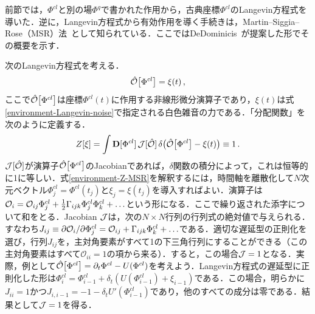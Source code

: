 \documentclass[a4paper,11pt]{ltjsarticle}
\def\D{\mathbf{D}}
\begin{document}
前節では，$\Phi^{cl}$と別の場$\Phi^q$で書かれた作用から，古典座標$\Phi^{cl}$のLangevin方程式を導いた．逆に，Langevin方程式から有効作用を導く手続きは，Martin--Siggia--Rose（MSR）法~\cite{Martin:1973zz}として知られている．ここではDeDominicis~\cite{DeDominicis}が提案した形でその概要を示す．


次のLangevin方程式を考える．
\begin{equation}
\hat {\cal O}\big[\Phi^{cl}\big] = \xi(t)\, ,
\end{equation}ここで$\hat {\cal O}\big[\Phi^{cl}\big]$は座標$\Phi^{cl}(t)$に作用する非線形微分演算子であり，$\xi(t)$は式\eqref{environment-Langevin-noise}で指定される白色雑音の力である．「分配関数」を次のように定義する．
\begin{equation}\label{environment-Z-MSR}
Z[\xi]=\int\D[\Phi^{cl}]\, {\cal J}[\hat {\cal O }
]\,\delta\big(\hat {\cal O}\big[\Phi^{cl}\big] - \xi(t)\big) \equiv
1\, .
\end{equation}${\cal J}[\hat {\cal O}]$が演算子$\hat {\cal O}\big[\Phi^{cl}\big]$のJacobianであれば，$\delta$関数の積分によって，これは恒等的に1に等しい．式\eqref{environment-Z-MSR}を解釈するには，時間軸を離散化して$N$次元ベクトル$\Phi^{cl}_j=\Phi^{cl}(t_j)$と$\xi_j=\xi(t_j)$を導入すればよい．演算子は${\cal O}_i=\mathcal{O}_{ij}\Phi^{cl}_j+{1\over
2}\Gamma_{ijk}\Phi^{cl}_j\Phi^{cl}_k +\ldots$という形になる．ここで繰り返された添字について和をとる．Jacobian ${\cal J}$は，次の$N\times N$行列の行列式の絶対値で与えられる．すなわち$J_{ij}\equiv
\partial {\cal O}_i/ \partial\Phi^{cl}_j=
\mathcal{O}_{ij}+\Gamma_{ijk}\Phi^{cl}_k+\ldots$である．適切な遅延型の正則化を選び，行列$J_{ij}$を，主対角要素がすべて1の下三角行列にすることができる（この主対角要素はすべて$\mathcal{O}_{ii}=1$の項から来る）．すると，この場合${\cal J}=1$となる．実際，例として$\hat {\cal O}\big[\Phi^{cl}\big]=\partial_t\Phi^{cl}-U(\Phi^{cl})$を考えよう．Langevin方程式の遅延型に正則化した形は$\Phi^{cl}_{i}
=\Phi^{cl}_{i-1}+\delta_t(U(\Phi^{cl}_{i-1})+\xi_{i-1})$である．この場合，明らかに$J_{ii}=1$かつ$J_{i,i-1}=-1-\delta_t
U'(\Phi^{cl}_{i-1})$であり，他のすべての成分は零である．結果として${\cal J}=1$を得る．
\end{document}
